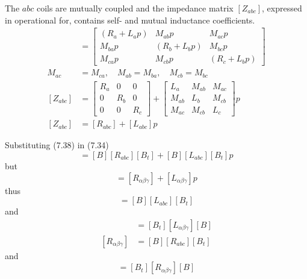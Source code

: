 \documentclass[a4paper,numbers=noenddot,12pt]{scrbook}
\begin{document}
    The $abc$ coils are mutually coupled and the impedance matrix $[Z_{abc}]$, expressed in operational for, contains self- and mutual inductance coefficients.
    \begin{align}
        [Z_{abc}]
        & =
        \begin{bmatrix}
            (R_a + L_a p) & M_{ab} p & M_{ac} p \\
            M_{ba} p & (R_b + L_b p) & M_{bc} p \\
            M_{ca} p & M_{cb} p & (R_c + L_b p)
        \end{bmatrix} \\
        M_{ac} & = M_{ca}, \quad M_{ab} = M_{ba}, \quad M_{cb} = M_{bc} \nonumber \\
        [Z_{abc}] & =
        \begin{bmatrix}
            R_a & 0 & 0 \\
            0 & R_b & 0 \\
            0 & 0 & R_c
        \end{bmatrix}
        +
        \begin{bmatrix}
            L_a & M_{ab} & M_{ac} \\
            M_{ab} & L_b & M_{cb} \\
            M_{ac} & M_{cb} & L_c
        \end{bmatrix}
        p \\
        [Z_{abc}] & = [R_{abc}] + [L_{abc}] p
        \label{eq:Eq7.38}
    \end{align}

    Substituting (7.38) in (7.34)
    \begin{equation}
        [Z_{\alpha \beta \gamma}] = [B][R_{abc}][B_t] + [B][L_{abc}][B_t]p
        \label{eq:Eq7.39}
    \end{equation}
    but
    \begin{equation}
        [Z_{\alpha \beta \gamma}] = [R_{\alpha \beta \gamma}] + [L_{\alpha \beta \gamma}]p
        \label{eq:Eq7.40}
    \end{equation}
    thus
    \begin{equation}
        [L_{\alpha \beta \gamma}] = [B][L_{abc}][B_t]
        \label{eq:Eq7.41}
    \end{equation}
    and
    \begin{align}
        [L_{abc}] & = [B_t][L_{\alpha \beta \gamma}][B] \\
        [R_{\alpha \beta \gamma}] & = [B][R_{abc}][B_t]
        \label{eq:Eq7.43}
    \end{align}
    and
    \begin{equation}
        [R_{abc}] = [B_t][R_{\alpha \beta \gamma}][B]
        \label{eq:Eq7.44}
    \end{equation}
\end{document}
